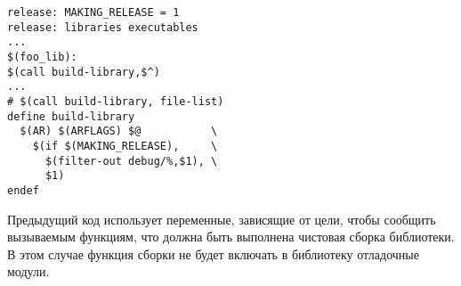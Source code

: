 {\footnotesize
\begin{verbatim}
release: MAKING_RELEASE = 1
release: libraries executables
...
$(foo_lib):
$(call build-library,$^)
...
# $(call build-library, file-list)
define build-library
  $(AR) $(ARFLAGS) $@           \
    $(if $(MAKING_RELEASE),     \
      $(filter-out debug/%,$1), \
	  $1)
endef
\end{verbatim}
}

Предыдущий код использует переменные, зависящие от цели, чтобы
сообщить вызываемым функциям, что должна быть выполнена чистовая
сборка библиотеки.  В этом случае функция сборки не будет включать в
библиотеку отладочные модули.
